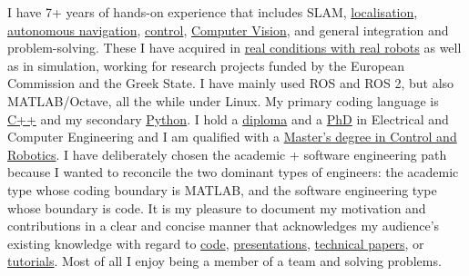 \documentclass[a4paper,10pt,twoside]{article}
\begin{document}

\par{\bigskip\par}


\vspace{-0.5cm}
\begin{bw_box} \small
  I have 7+ years of hands-on experience that includes SLAM, \href{https://github.com/li9i/fsm-lo}{localisation},
  \href{https://link.springer.com/article/10.1007/s10846-019-01086-y}{autonomous navigation}, \href{https://www.tandfonline.com/doi/full/10.1080/00207179.2018.1514129}{control},
  \href{https://github.com/li9i/pandora\_vision\_2014}{Computer Vision}, and
  general integration and problem-solving. These I have acquired in \href{https://relief.web.auth.gr/\%CF\%81\%CE\%BF\%CE\%BC\%CF\%80\%CE\%BF\%CF\%84\%CE\%B9\%CE\%BA\%CE\%AC-\%CE\%BF\%CF\%87\%CE\%AE\%CE\%BC\%CE\%B1\%CF\%84\%CE\%B1/}{real
  conditions with real robots} as well as in simulation, working for research
  projects funded by the European Commission and the Greek State. I have mainly
  used ROS and ROS 2, but also MATLAB/Octave, all the while under Linux. My
  primary coding language is \href{https://github.com/li9i/fsm}{C++} and my
  secondary
  \href{https://github.com/cultureid-auth-ros-packages/cultureid-waypoints-following}{Python}.
  I hold a \href{https://ikee.lib.auth.gr/record/291560}{diploma} and a \href{https://ikee.lib.auth.gr/record/354644}{PhD} in Electrical and Computer Engineering and I
  am qualified with a
  \href{http://kth.diva-portal.org/smash/record.jsf?pid=diva2\%3A1102597\&dswid=2875}{Master's degree in Control and Robotics}.
  I have deliberately chosen the academic + software engineering path because I
  wanted to reconcile the two dominant types of engineers: the academic type
  whose coding boundary is MATLAB, and the software engineering type whose
  boundary is code.
  It is my pleasure to document my motivation and contributions in a clear and concise
  manner that acknowledges my audience's existing knowledge with regard to
  \href{https://github.com/li9i/pandora_vision_2014/blob/hydro-devel/pandora_vision_hole_detector/src/hole_fusion_node/hole_fusion.cpp}{code},
  \href{https://www.youtube.com/watch?v=xaDKjI0WkDc}{presentations}, \href{https://ieeexplore.ieee.org/abstract/document/9981228}{technical papers},
  or \href{https://github.com/li9i/ros1_humble_bridge_template}{tutorials}. Most of all I enjoy being a member of a team and solving problems.
\end{bw_box}
\end{document}
